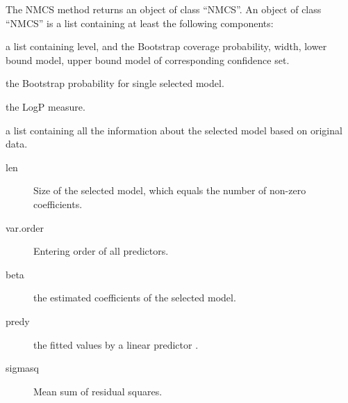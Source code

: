 \documentclass[a4paper]{book}
\begin{document}
\begin{Value}
The NMCS method returns an object of class “NMCS”. An object of
class “NMCS” is a list containing at least the following components:
\begin{ldescription}
\item[\code{mcs}] a list containing  level, and the Bootstrap coverage probability,
width, lower bound model, upper bound model
of corresponding  confidence set.
\item[\code{hat\_prob}] the Bootstrap probability for single selected model.
\item[\code{hat\_logp}] the LogP measure.
\item[\code{hat\_M}] a list containing all the information about the selected model
based on original data.
\begin{description}

\item[len] Size of the selected model, which equals the number of non-zero
coefficients.
\item[var.order] Entering order of all predictors.
\item[beta] the estimated coefficients of the selected model.
\item[predy] the fitted values by a linear predictor .
\item[sigmasq] Mean sum of residual squares.

\end{description}


\end{ldescription}
\end{Value}
%
\begin{Examples}
\end{Examples}
\end{document}
